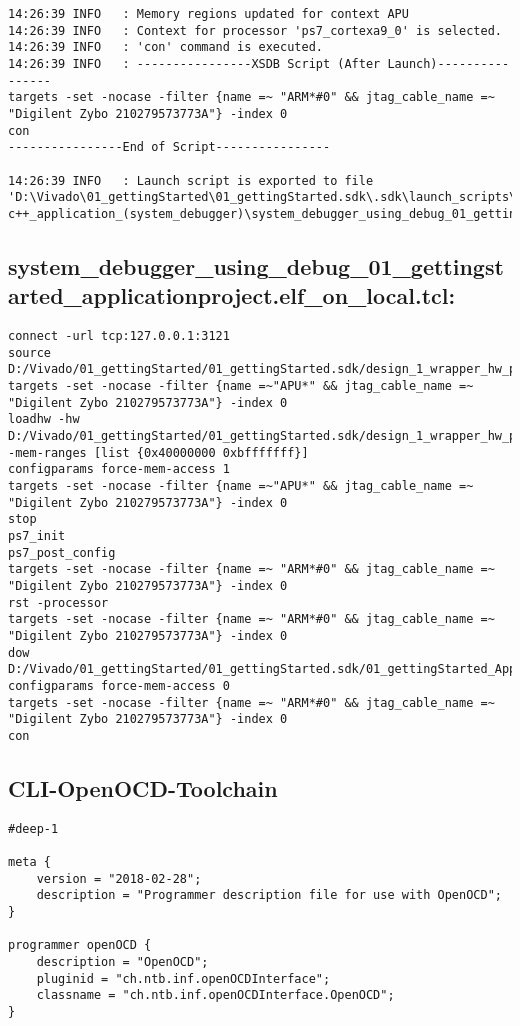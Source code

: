 \begin{lstlisting}
14:26:39 INFO	: Memory regions updated for context APU
14:26:39 INFO	: Context for processor 'ps7_cortexa9_0' is selected.
14:26:39 INFO	: 'con' command is executed.
14:26:39 INFO	: ----------------XSDB Script (After Launch)----------------
targets -set -nocase -filter {name =~ "ARM*#0" && jtag_cable_name =~ "Digilent Zybo 210279573773A"} -index 0
con
----------------End of Script----------------

14:26:39 INFO	: Launch script is exported to file 'D:\Vivado\01_gettingStarted\01_gettingStarted.sdk\.sdk\launch_scripts\xilinx_c-c++_application_(system_debugger)\system_debugger_using_debug_01_gettingstarted_applicationproject.elf_on_local.tcl'
\end{lstlisting}


\subsection{system\_debugger\_using\_debug\_01\_gettingstarted\_applicationproject.elf\_on\_local.tcl:}
\label{anhang:elf_on_local.tcl}
\lstset{language=plain}
\begin{lstlisting}
connect -url tcp:127.0.0.1:3121
source D:/Vivado/01_gettingStarted/01_gettingStarted.sdk/design_1_wrapper_hw_platform_0/ps7_init.tcl
targets -set -nocase -filter {name =~"APU*" && jtag_cable_name =~ "Digilent Zybo 210279573773A"} -index 0
loadhw -hw D:/Vivado/01_gettingStarted/01_gettingStarted.sdk/design_1_wrapper_hw_platform_0/system.hdf -mem-ranges [list {0x40000000 0xbfffffff}]
configparams force-mem-access 1
targets -set -nocase -filter {name =~"APU*" && jtag_cable_name =~ "Digilent Zybo 210279573773A"} -index 0
stop
ps7_init
ps7_post_config
targets -set -nocase -filter {name =~ "ARM*#0" && jtag_cable_name =~ "Digilent Zybo 210279573773A"} -index 0
rst -processor
targets -set -nocase -filter {name =~ "ARM*#0" && jtag_cable_name =~ "Digilent Zybo 210279573773A"} -index 0
dow D:/Vivado/01_gettingStarted/01_gettingStarted.sdk/01_gettingStarted_ApplicationProject/Debug/01_gettingStarted_ApplicationProject.elf
configparams force-mem-access 0
targets -set -nocase -filter {name =~ "ARM*#0" && jtag_cable_name =~ "Digilent Zybo 210279573773A"} -index 0
con
\end{lstlisting}


\subsection{CLI-OpenOCD-Toolchain}
\label{anhang:CLI-OpenOCD-Toolchain}
\lstset{language=java}
\begin{lstlisting}
#deep-1

meta {
	version = "2018-02-28";
	description = "Programmer description file for use with OpenOCD";
}

programmer openOCD {
	description = "OpenOCD";
	pluginid = "ch.ntb.inf.openOCDInterface";
	classname = "ch.ntb.inf.openOCDInterface.OpenOCD";
}
\end{lstlisting}





